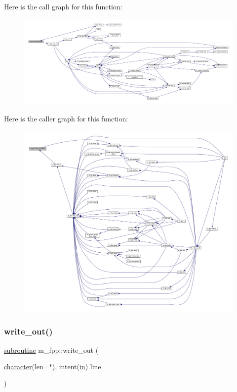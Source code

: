 Here is the call graph for this function\+:
\nopagebreak
\begin{figure}[H]
\begin{center}
\leavevmode
\includegraphics[width=350pt]{namespacem__fpp_a2b24b85d02a85630ee16ee81d5277c28_cgraph}
\end{center}
\end{figure}
Here is the caller graph for this function\+:
\nopagebreak
\begin{figure}[H]
\begin{center}
\leavevmode
\includegraphics[width=350pt]{namespacem__fpp_a2b24b85d02a85630ee16ee81d5277c28_icgraph}
\end{center}
\end{figure}
\mbox{\label{namespacem__fpp_a945cf0930719327ca5ee9a866c11dc7a}} 
\subsubsection{\texorpdfstring{write\+\_\+out()}{write\_out()}}
{\footnotesize\ttfamily \hyperlink{M__stopwatch_83_8txt_acfbcff50169d691ff02d4a123ed70482}{subroutine} m\+\_\+fpp\+::write\+\_\+out (\begin{DoxyParamCaption}\item[{\hyperlink{option__stopwatch_83_8txt_abd4b21fbbd175834027b5224bfe97e66}{character}(len=$\ast$), intent(\hyperlink{M__journal_83_8txt_afce72651d1eed785a2132bee863b2f38}{in})}]{line }\end{DoxyParamCaption})}




